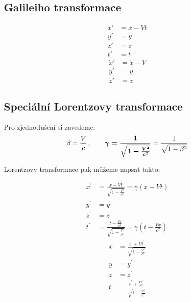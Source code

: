 \documentclass[a5paper,12pt]{article}
\begin{document}
\subsection{Galileiho transformace}

\begin{multicols}{2}\noindent
\begin{align*}
	x' &= x - Vt\\
	y' &= y\\	
	z' &= z\\	
	t' &= t
\end{align*}
\columnbreak
\begin{align*}
	\dot{x}' &= \dot{x} - V\\
	\dot{y}' &= \dot{y}\\
	\dot{z}' &= \dot{z}
\end{align*}
\end{multicols}

\subsection{Speciální Lorentzovy transformace}

Pro zjednodušení si zavedeme:
\begin{equation*}
\beta = {V\over c}\,,		\qquad		\boldsymbol{\gamma = {1 \over \sqrt{1 - {V^2 \over c^2}}}} = {1 \over \sqrt{1-\beta^2}}
\end{equation*}

\noindent Lorentzovy transformace pak můžeme napsat takto:

\begin{multicols}{2}\noindent
\begin{align*}
x^\prime &= \frac{x - Vt}{\sqrt{1 - \frac{V^2}{c^2}}} = \gamma\left(x - Vt\right) \\
y^\prime &= y\\
z^\prime &= z\\
t^\prime &= \frac{t - \frac{Vx}{c^2}}{\sqrt{1 - \frac{V^2}{c^2}}} =  \gamma\left(t - \frac{Vx}{c^2}\right)
\end{align*}
\columnbreak
\begin{align*}
x &= \frac{x^\prime + Vt^\prime}{\sqrt{1 - \frac{V^2}{c^2}}}\\
y &= y^\prime\\
z &= z^\prime\\
t &= \frac{t^\prime + \frac{Vx^\prime}{c^2}}{\sqrt{1 - \frac{V^2}{c^2}}}
\end{align*}
\end{multicols}
\end{document}
